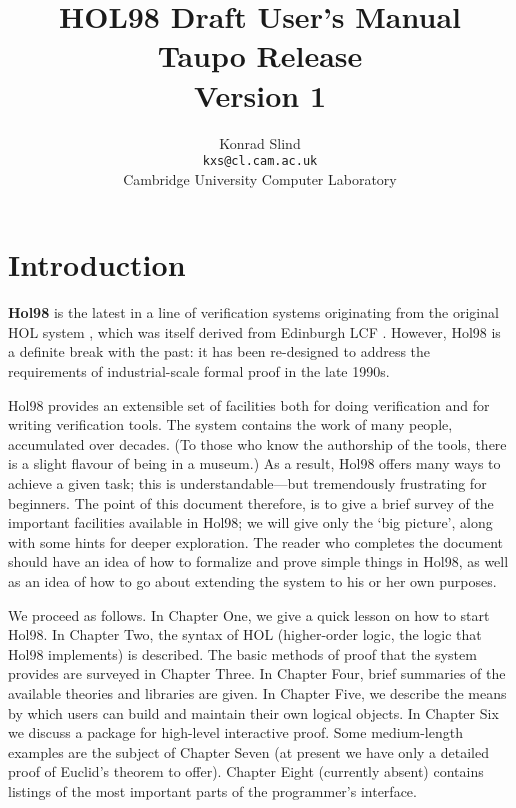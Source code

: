 \documentclass[12pt,fleqn,a4paper]{report}
\begin{document}
 \title {HOL98 Draft User's Manual \\ Taupo Release \\ Version 1}
 \author{Konrad Slind \\ {\tt kxs@cl.cam.ac.uk} \\
         Cambridge University Computer Laboratory}
 \maketitle


 \section*{Introduction}

 {\bf Hol98} is the latest in a line of verification systems originating
 from the original HOL system \cite{hol88:book}, which was itself
 derived from Edinburgh LCF \cite{lcf:book}. However, Hol98 is a
 definite break with the past: it has been re-designed to address the
 requirements of industrial-scale formal proof in the late 1990s.

 Hol98 provides an extensible set of facilities both for doing
 verification and for writing verification tools. The system contains the
 work of many people, accumulated over decades. (To those who know the
 authorship of the tools, there is a slight flavour of being in a
 museum.) As a result, Hol98 offers many ways to achieve a given task;
 this is understandable---but tremendously frustrating for beginners.
 The point of this document therefore, is to give a brief survey of the
 important facilities available in Hol98; we will give only the `big
 picture', along with some hints for deeper exploration. The reader who
 completes the document should have an idea of how to formalize and prove
 simple things in Hol98, as well as an idea of how to go about extending
 the system to his or her own purposes.

  We proceed as follows. In Chapter One, we give a quick lesson on how
 to start Hol98.  In Chapter Two, the syntax of HOL (higher-order logic,
 the logic that Hol98 implements) is described. The basic methods of
 proof that the system provides are surveyed in Chapter Three. In
 Chapter Four, brief summaries of the available theories and libraries
 are given. In Chapter Five, we describe the means by which users can
 build and maintain their own logical objects. In Chapter Six we discuss
 a package for high-level interactive proof. Some medium-length
 examples are the subject of Chapter Seven (at present we have only a
 detailed proof of Euclid's theorem to offer).  Chapter Eight (currently
 absent) contains listings of the most important parts of the
 programmer's interface.
\end{document}
